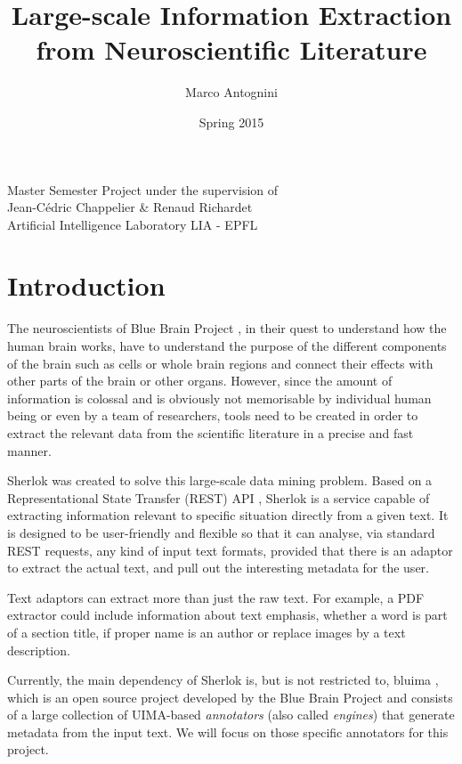 \documentclass{article}
\title{Large-scale Information Extraction from Neuroscientific Literature}
\date{Spring 2015}
\author{Marco Antognini}
\begin{document}
\maketitle

\begin{center}
    Master Semester Project under the supervision of\\
    Jean-Cédric Chappelier \& Renaud Richardet\\
    Artificial Intelligence Laboratory LIA - EPFL
\end{center}

\newpage
{}


\tableofcontents

\section{Introduction}

The neuroscientists of Blue Brain Project \cite{bbp}, in their quest to understand how the human
brain works, have to understand the purpose of the different components of the brain such as cells
or whole brain regions and connect their effects with other parts of the brain or other organs.
However, since the amount of information is colossal and is obviously not memorisable by individual
human being or even by a team of researchers, tools need to be created in order to extract the relevant
data from the scientific literature in a precise and fast manner.

Sherlok \cite{sherlok} was created to solve this large-scale data mining problem. Based on a
Representational State Transfer (REST) API , Sherlok is a service capable of extracting information
relevant to specific situation directly from a given text. It is designed to be user-friendly and
flexible so that it can analyse, via standard REST requests, any kind of input text formats,
provided that there is an adaptor to extract the actual text, and pull out the interesting metadata
for the user.

Text adaptors can extract more than just the raw text. For example, a PDF extractor could include
information about text emphasis, whether a word is part of a section title, if proper name is an
author or replace images by a text description.

Currently, the main dependency of Sherlok is, but is not restricted to, bluima \cite{bluima}, which
is an open source project developed by the Blue Brain Project and consists of a large collection of
UIMA-based \emph{annotators} (also called \emph{engines}) \cite{uima} that generate metadata from
the input text. We will focus on those specific annotators for this project.
\end{document}
